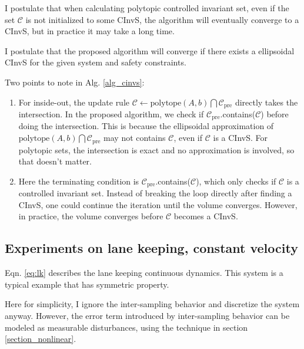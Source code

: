 \documentclass{article}
\begin{document}
I postulate that when calculating polytopic controlled invariant set, even if the set $\mathcal C$ is not initialized to some CInvS, the algorithm will eventually converge to a CInvS, but in practice it may take a long time.

I postulate that the proposed algorithm will converge if there exists a ellipsoidal CInvS for the given system and safety constraints.

Two points to note in Alg. \ref{alg_cinvs}:
\begin{enumerate}
\item For inside-out, the update rule $\mathcal C \leftarrow \text{polytope}(A,b) \bigcap \mathcal C_{\text{pre}}$ directly takes the intersection. In the proposed algorithm, we check if $\mathcal C_{\text{pre}}$.contains($\mathcal C$) before doing the intersection. This is because the ellipsoidal approximation of $\text{polytope}(A,b) \bigcap \mathcal C_{\text{pre}}$ may not contains $\mathcal C$, even if $\mathcal C$ is a CInvS. For polytopic sets, the intersection is exact and no approximation is involved, so that doesn't matter.
\item Here the terminating condition is $\mathcal C_{\text{pre}}$.contains($\mathcal C$), which only checks if $\mathcal C$ is a controlled invariant set. Instead of breaking the loop directly after finding a CInvS, one could continue the iteration until the volume converges. However, in practice, the volume converges before $\mathcal C$ becomes a CInvS.
\end{enumerate}

\subsection{Experiments on lane keeping, constant velocity}

Eqn. \ref{eq:lk} describes the lane keeping continuous dynamics. This system is a typical example that has symmetric property.

Here for simplicity, I ignore the inter-sampling behavior and discretize the system anyway. However, the error term introduced by inter-sampling behavior can be modeled as measurable disturbances, using the technique in section \ref{section_nonlinear}.
\end{document}
